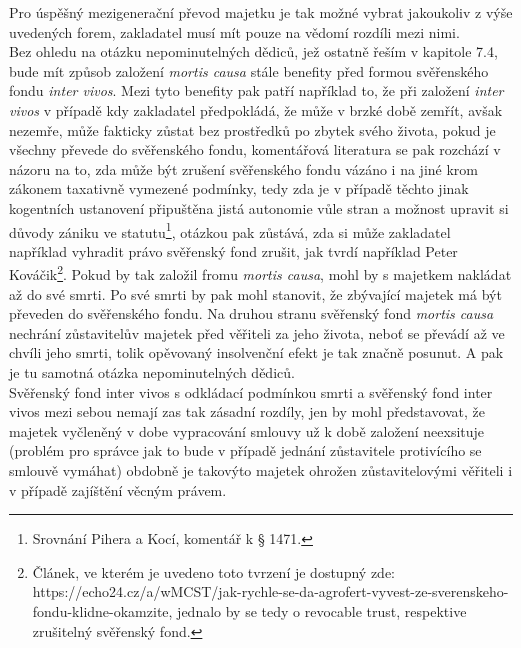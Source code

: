 \documentclass{article}
\begin{document}
Pro úspěšný mezigenerační převod majetku je tak možné vybrat jakoukoliv z výše uvedených forem, zakladatel musí mít pouze na vědomí rozdíli mezi nimi.\\


Bez ohledu na otázku nepominutelných dědiců, jež ostatně řeším v kapitole 7.4, bude mít způsob založení \textit{mortis causa} stále benefity před formou svěřenského fondu \textit{inter vivos}. Mezi tyto benefity pak patří například to, že při založení \textit{inter vivos} v případě kdy zakladatel předpokládá, že může v brzké době zemřít, avšak nezemře, může fakticky zůstat bez prostředků po zbytek svého života, pokud je všechny převede do svěřenského fondu, komentářová literatura se pak rozchází v názoru na to, zda může být zrušení svěřenského fondu vázáno i na jiné krom zákonem taxativně vymezené podmínky, tedy zda je v případě těchto jinak kogentních ustanovení připuštěna jistá autonomie vůle stran a možnost upravit si důvody zániku ve statutu\footnote{Srovnání Pihera a Kocí, komentář k § 1471.}, otázkou pak zůstává, zda si může zakladatel například vyhradit právo svěřenský fond zrušit, jak tvrdí například Peter Kováčik\footnote{Článek, ve kterém je uvedeno toto tvrzení je dostupný zde: https://echo24.cz/a/wMCST/jak-rychle-se-da-agrofert-vyvest-ze-sverenskeho-fondu-klidne-okamzite, jednalo by se tedy o revocable trust, respektive zrušitelný svěřenský fond.}. Pokud by tak založil fromu \textit{mortis causa}, mohl by s majetkem nakládat až do své smrti. Po své smrti by pak mohl stanovit, že zbývající majetek má být převeden do svěřenského fondu. Na druhou stranu svěřenský fond \textit{mortis causa} nechrání zůstavitelův majetek před věřiteli za jeho života, neboť se převádí až ve chvíli jeho smrti, tolik opěvovaný insolvenční efekt je tak značně posunut. A pak je tu samotná otázka nepominutelných dědiců.\\


Svěřenský fond inter vivos s odkládací podmínkou smrti a svěřenský fond inter vivos mezi sebou nemají zas tak zásadní rozdíly, jen by mohl představovat, že majetek vyčleněný v dobe vypracování smlouvy už k době založení neexsituje (problém pro správce jak to bude v případě jednání zůstavitele protivícího se smlouvě vymáhat) obdobně je takovýto majetek ohrožen zůstavitelovými věřiteli i v případě zajíštění věcným právem.\\
\end{document}
